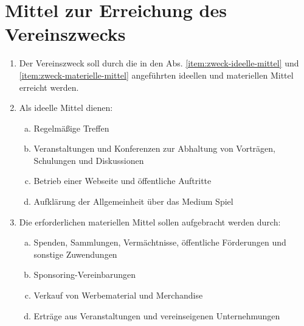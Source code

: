 \documentclass[a4paper,12pt]{article}
\newcommand{\comment}[1]{{\bf /*Komm.:} \textit{#1} {\bf */}}
\def\comment#1{}
\begin{document}
\section{Mittel zur Erreichung des Vereinszwecks}%
\label{sec:Mittel}
\begin{enumerate}
\item Der Vereinszweck soll durch die in den Abs. \ref{item:zweck-ideelle-mittel} und \ref{item:zweck-materielle-mittel} angeführten ideellen und materiellen Mittel erreicht werden.

\item\label{item:zweck-ideelle-mittel} Als ideelle Mittel dienen:
\comment{hier noch wording/items überarbeiten?}
\begin{enumerate}[(a)]
\item Regelmäßige Treffen \comment{und Zusammenkünfte \comment{Wo ist der Unterschied?}}
\item Veranstaltungen und Konferenzen zur Abhaltung von Vorträgen, Schulungen und Diskussionen
\item Betrieb einer Webseite und \"offentliche Auftritte
\item Aufkl\"arung der Allgemeinheit \"uber das Medium Spiel

\end{enumerate}
\item\label{item:zweck-materielle-mittel} Die erforderlichen materiellen Mittel sollen aufgebracht werden durch:
\comment{hier noch wording/items überarbeiten?}
\comment{
\begin{enumerate}[(a)]
\item Sponsoringvereinbarungen (Werbung im Rahmen von Vereinsveranstaltungen)
\item Erträgen aus Veranstaltungen, vereinseigenen Unternehmungen
\item Spenden, Sammlungen, Vermächtnisse und sonstige Zuwendungen
\item Förderungen und Subventionen
}

\begin{enumerate}[(a)]
\item Spenden, Sammlungen, Vermächtnisse, öffentliche Förderungen und sonstige Zuwendungen
\item Sponsoring-Vereinbarungen
\item Verkauf von Werbematerial und Merchandise
\item Erträge aus Veranstaltungen und vereinseigenen Unternehmungen
\end{enumerate}

\end{enumerate}
\end{document}
